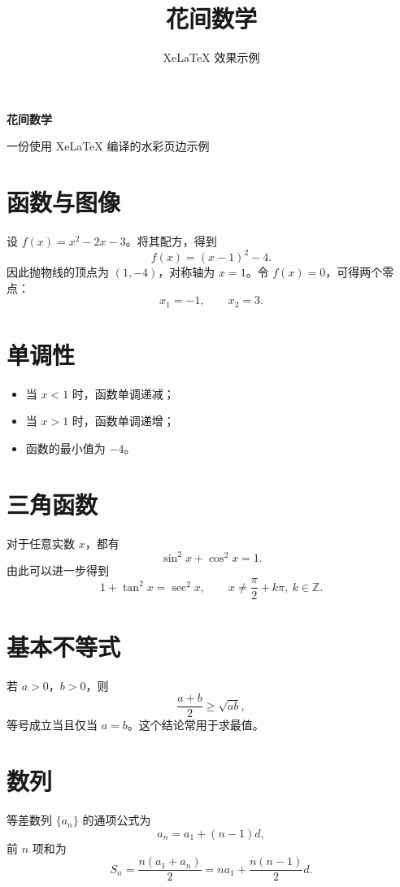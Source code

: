 \documentclass[11pt]{ctexart}
\title{花间数学}
\author{XeLaTeX 效果示例}
\date{}
\begin{document}
\thispagestyle{empty}
\begin{center}
  {\Huge\bfseries 花间数学\par}
  \vspace{1em}
  {\large 一份使用 XeLaTeX 编译的水彩页边示例\par}
\end{center}
\vspace{2em}

\section{函数与图像}
设 $f(x)=x^2-2x-3$。将其配方，得到
\begin{equation}
  f(x)=(x-1)^2-4.
\end{equation}
因此抛物线的顶点为 $(1,-4)$，对称轴为 $x=1$。令 $f(x)=0$，可得两个零点：
\[
  x_1=-1,\qquad x_2=3.
\]

\section{单调性}
\begin{itemize}
  \item 当 $x<1$ 时，函数单调递减；
  \item 当 $x>1$ 时，函数单调递增；
  \item 函数的最小值为 $-4$。
\end{itemize}

\newpage
{}
\section{三角函数}
对于任意实数 $x$，都有
\[
  \sin^2 x+\cos^2 x=1.
\]
由此可以进一步得到
\[
  1+\tan^2 x=\sec^2 x,
  \qquad x\neq \frac{\pi}{2}+k\pi,\ k\in\mathbb{Z}.
\]

\section{基本不等式}
若 $a>0$，$b>0$，则
\begin{equation}
  \frac{a+b}{2}\geq \sqrt{ab},
\end{equation}
等号成立当且仅当 $a=b$。这个结论常用于求最值。

\newpage
{}
\section{数列}
等差数列 $\{a_n\}$ 的通项公式为
\[
  a_n=a_1+(n-1)d,
\]
前 $n$ 项和为
\[
  S_n=\frac{n(a_1+a_n)}{2}
     =na_1+\frac{n(n-1)}2d.
\]
\end{document}
